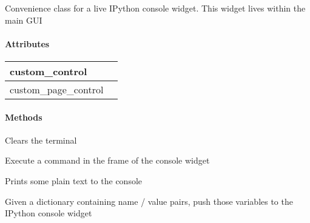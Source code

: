 \documentclass[letterpaper,10pt,english]{sphinxmanual}
\begin{document}
\begin{fulllineitems}
\label{QIPythonWidget:Ipython.QIPythonWidget}
Convenience class for a live IPython console widget.
This widget lives within the main GUI
\paragraph{Attributes}

\begin{tabulary}{\linewidth}{|L|L|}
\hline

custom\_control
 & \\
\hline
custom\_page\_control
 & \\
\hline\end{tabulary}

\paragraph{Methods}

\begin{fulllineitems}
\label{QIPythonWidget:Ipython.QIPythonWidget.clearTerminal}
Clears the terminal

\end{fulllineitems}


\begin{fulllineitems}
\label{QIPythonWidget:Ipython.QIPythonWidget.executeCommand}
Execute a command in the frame of the console widget

\end{fulllineitems}


\begin{fulllineitems}
\label{QIPythonWidget:Ipython.QIPythonWidget.printText}
Prints some plain text to the console

\end{fulllineitems}


\begin{fulllineitems}
\label{QIPythonWidget:Ipython.QIPythonWidget.pushVariables}
Given a dictionary containing name / value pairs, 
push those variables to the IPython console widget

\end{fulllineitems}


\end{fulllineitems}
\end{document}
